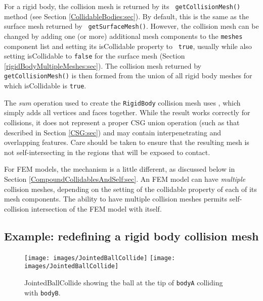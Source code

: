For a rigid body, the collision mesh is returned by its {\tt
getCollisionMesh()} method (see Section \ref{CollidableBodies:sec}).
By default, this is the same as the surface mesh returned by {\tt
getSurfaceMesh()}. However, the collision mesh can be changed by
adding one (or more) additional mesh components to the {\tt meshes}
component list and setting its {\sf isCollidable} property to {\tt
true}, usually while also setting {\sf isCollidable} to {\tt false}
for the surface mesh (Section \ref{rigidBodyMultipleMeshes:sec}). The
collision mesh returned by {\tt getCollisionMesh()} is then formed
from the union of all rigid body meshes for which {\sf isCollidable}
is {\tt true}.

\begin{sideblock}
The {\it sum} operation used to create the {\tt RigidBody} collision
mesh uses , which simply
adds all vertices and faces together. While the result works correctly
for collisions, it does not represent a proper CSG union operation
(such as that described in Section \ref{CSG:sec}) and may contain
interpenetrating and overlapping features. Care should be taken to
ensure that the resulting mesh is not self-intersecting in the regions
that will be exposed to contact.
\end{sideblock}

For FEM models, the mechanism is a little different, as discussed
below in Section \ref{CompoundCollidablesAndSelf:sec}.  An FEM model
can have {\it multiple} collision meshes, depending on the setting of
the {\sf collidable} property of each of its mesh components.  The
ability to have multiple collision meshes permits self-collision
intersection of the FEM model with itself.

\subsection{Example: redefining a rigid body collision mesh}

\begin{figure}[ht]
\begin{center}
\iflatexml
 \texttt{[image: images/JointedBallCollide]}
\else
 \texttt{[image: images/JointedBallCollide]}
\fi
\end{center}
\caption{JointedBallCollide showing the ball at the tip of 
{\tt bodyA} colliding with {\tt bodyB}.}
\label{JointedBallCollide:fig}
\end{figure}

